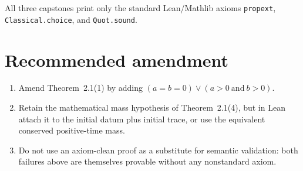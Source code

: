 \documentclass[11pt]{article}
\begin{document}
All three capstones print only the standard Lean/Mathlib axioms
\texttt{propext}, \texttt{Classical.choice}, and \texttt{Quot.sound}.

\section{Recommended amendment}

\begin{enumerate}[label=\arabic*.]
\item Amend Theorem~2.1(1) by adding
  $(a=b=0)\lor(a>0\ \text{and}\ b>0)$.
\item Retain the mathematical mass hypothesis of Theorem~2.1(4), but in Lean
  attach it to the initial datum plus initial trace, or use the equivalent
  conserved positive-time mass.
\item Do not use an axiom-clean proof as a substitute for semantic validation:
  both failures above are themselves provable without any nonstandard axiom.
\end{enumerate}
\end{document}
